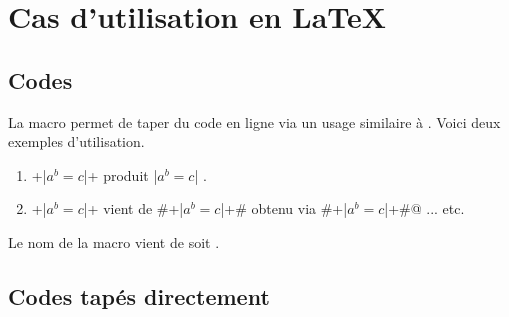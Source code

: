 

\usepackage[lang = french]{../main/main}
\usepackage{../macroenv/macroenv}
\usepackage{../inenglish/inenglish}
\usepackage{../showcase/showcase}
\usepackage{../rem-exa/rem-exa}

\usepackage{listing}







\section{Cas d'utilisation en \LaTeX}

\subsection{Codes }

La macro  permet de taper du code en ligne via un usage similaire à .
Voici deux exemples d'utilisation.

\begin{enumerate}
    \item \bdocinlatex+\bdocinlatex|$a^b = c$|+ produit \bdocinlatex|$a^b = c$| .

    \item \bdocinlatex+\bdocinlatex|$a^b = c$|+ vient de \bdocinlatex#\bdocinlatex+\bdocinlatex|$a^b = c$|+# obtenu via \bdocinlatex@\bdocinlatex#\bdocinlatex+\bdocinlatex|$a^b = c$|+#@ ... etc.
\end{enumerate}


\begin{bdocrem}
    Le nom de la macro  vient de  soit .
\end{bdocrem}




\subsection{Codes tapés directement}

